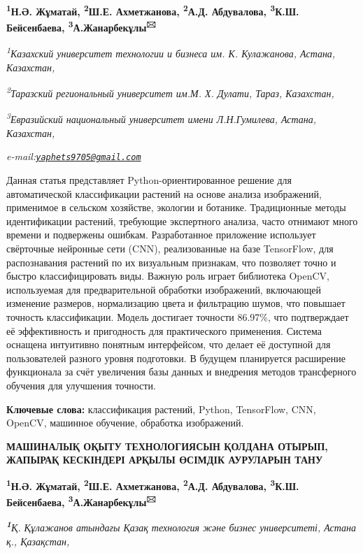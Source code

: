 \documentclass[
]{article}
\begin{document}
\textbf{\textsuperscript{1}Н.Ә. Жұматай, \textsuperscript{2}Ш.Е.
Ахметжанова, \textsuperscript{2}А.Д. Абдувалова, \textsuperscript{3}К.Ш.
Бейсенбаева, \textsuperscript{3}А.Жанарбекұлы\textsuperscript{🖂}}

\emph{\textsuperscript{1}Казахский университет технологии и бизнеса им.
К. Кулажанова, Астана, Казахстан,}

\emph{\textsuperscript{2}Таразский региональный университет им.М. Х.
Дулати, Тараз, Казахстан,}

\emph{\textsuperscript{3}Евразийский национальный университет имени
Л.Н.Гумилева, Астана, Казахстан,}

\emph{e-mail:\href{mailto:yaphets9705@gmail.com}{\nolinkurl{yaphets9705@gmail.com}}}

Данная статья представляет Python-ориентированное решение для
автоматической классификации растений на основе анализа изображений,
применимое в сельском хозяйстве, экологии и ботанике. Традиционные
методы идентификации растений, требующие экспертного анализа, часто
отнимают много времени и подвержены ошибкам. Разработанное приложение
использует свёрточные нейронные сети (CNN), реализованные на базе
TensorFlow, для распознавания растений по их визуальным признакам, что
позволяет точно и быстро классифицировать виды. Важную роль играет
библиотека OpenCV, используемая для предварительной обработки
изображений, включающей изменение размеров, нормализацию цвета и
фильтрацию шумов, что повышает точность классификации. Модель достигает
точности 86.97\%, что подтверждает её эффективность и пригодность для
практического применения. Система оснащена интуитивно понятным
интерфейсом, что делает её доступной для пользователей разного уровня
подготовки. В будущем планируется расширение функционала за счёт
увеличения базы данных и внедрения методов трансферного обучения для
улучшения точности.

\textbf{Ключевые слова:} классификация растений, Python, TensorFlow,
CNN, OpenCV, машинное обучение, обработка изображений.

\textbf{МАШИНАЛЫҚ ОҚЫТУ ТЕХНОЛОГИЯСЫН ҚОЛДАНА ОТЫРЫП, ЖАПЫРАҚ КЕСКІНДЕРІ
АРҚЫЛЫ ӨСІМДІК АУРУЛАРЫН ТАНУ}

\textbf{\textsuperscript{1}Н.Ә. Жұматай, \textsuperscript{2}Ш.Е.
Ахметжанова, \textsuperscript{2}А.Д. Абдувалова, \textsuperscript{3}К.Ш.
Бейсенбаева, \textsuperscript{3}А.Жанарбекұлы\textsuperscript{🖂}}

\emph{\textbf{\textsuperscript{1}}Қ. Құлажанов атындағы Қазақ технология
және бизнес университеті, Астана қ., Қазақстан,}
\end{document}
